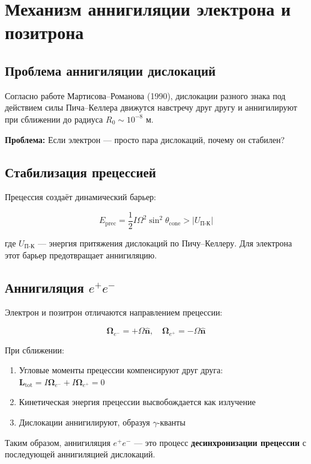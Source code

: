 \documentclass[12pt]{article}
\begin{document}
\section{Механизм аннигиляции электрона и позитрона}

\subsection{Проблема аннигиляции дислокаций}

Согласно работе Мартисова–Романова (1990), дислокации разного знака под действием силы Пича–Келлера движутся навстречу друг другу и аннигилируют при сближении до радиуса $R_0 \sim 10^{-8}$ м.

\textbf{Проблема:} Если электрон — просто пара дислокаций, почему он стабилен?

\subsection{Стабилизация прецессией}

Прецессия создаёт динамический барьер:

\[
E_{\text{prec}} = \frac{1}{2} I \Omega^2 \sin^2\theta_{\text{cone}} > |U_{\text{П-К}}|
\]

где $U_{\text{П-К}}$ — энергия притяжения дислокаций по Пичу–Келлеру. Для электрона этот барьер предотвращает аннигиляцию.

\subsection{Аннигиляция $e^+e^-$}

Электрон и позитрон отличаются направлением прецессии:

\[
\boldsymbol{\Omega}_{e^-} = +\Omega \hat{\boldsymbol{n}}, \quad \boldsymbol{\Omega}_{e^+} = -\Omega \hat{\boldsymbol{n}}
\]

При сближении:

\begin{enumerate}
\item Угловые моменты прецессии компенсируют друг друга: $\boldsymbol{L}_{\text{tot}} = I\boldsymbol{\Omega}_{e^-} + I\boldsymbol{\Omega}_{e^+} = 0$
\item Кинетическая энергия прецессии высвобождается как излучение
\item Дислокации аннигилируют, образуя $\gamma$-кванты
\end{enumerate}

Таким образом, аннигиляция $e^+e^-$ — это процесс \textbf{десинхронизации прецессии} с последующей аннигиляцией дислокаций.
\end{document}
